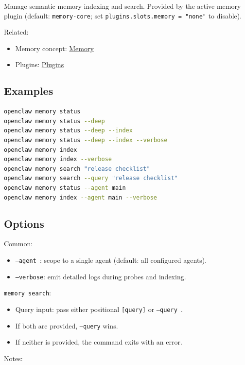 Manage semantic memory indexing and search.
Provided by the active memory plugin (default: \texttt{memory-core}; set \texttt{plugins.slots.memory = "none"} to disable).

Related:

\begin{itemize}
  \item Memory concept: \href{/concepts/memory}{Memory}
  \item Plugins: \href{/tools/plugin}{Plugins}
\end{itemize}


\subsection{Examples}


\begin{lstlisting}[language=bash]
openclaw memory status
openclaw memory status --deep
openclaw memory status --deep --index
openclaw memory status --deep --index --verbose
openclaw memory index
openclaw memory index --verbose
openclaw memory search "release checklist"
openclaw memory search --query "release checklist"
openclaw memory status --agent main
openclaw memory index --agent main --verbose
\end{lstlisting}


\subsection{Options}


Common:

\begin{itemize}
  \item \texttt{--agent }: scope to a single agent (default: all configured agents).
  \item \texttt{--verbose}: emit detailed logs during probes and indexing.
\end{itemize}


\texttt{memory search}:

\begin{itemize}
  \item Query input: pass either positional \texttt{[query]} or \texttt{--query }.
  \item If both are provided, \texttt{--query} wins.
  \item If neither is provided, the command exits with an error.
\end{itemize}


Notes:

